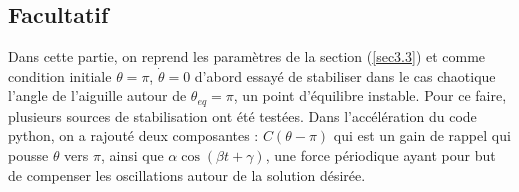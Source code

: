 \documentclass[a4paper,12pt,twoside]{article}
\begin{document}
\subsection{Facultatif}

Dans cette partie, on reprend les paramètres de la section (\ref{sec3.3}) et comme condition initiale $\theta=\pi$, $\dot{\theta}=0$ d'abord essayé de stabiliser dans le cas chaotique l'angle de l'aiguille autour de $\theta_{eq}=\pi$, un point d'équilibre instable. Pour ce faire, plusieurs sources de stabilisation ont été testées. Dans l'accélération du code python, on a rajouté deux composantes : $C(\theta - \pi)$ qui est un gain de rappel qui pousse $\theta$ vers $\pi$, ainsi que $\alpha \cos(\beta t + \gamma)$, une force périodique ayant pour but de compenser les oscillations autour de la solution désirée. 
\end{document}
